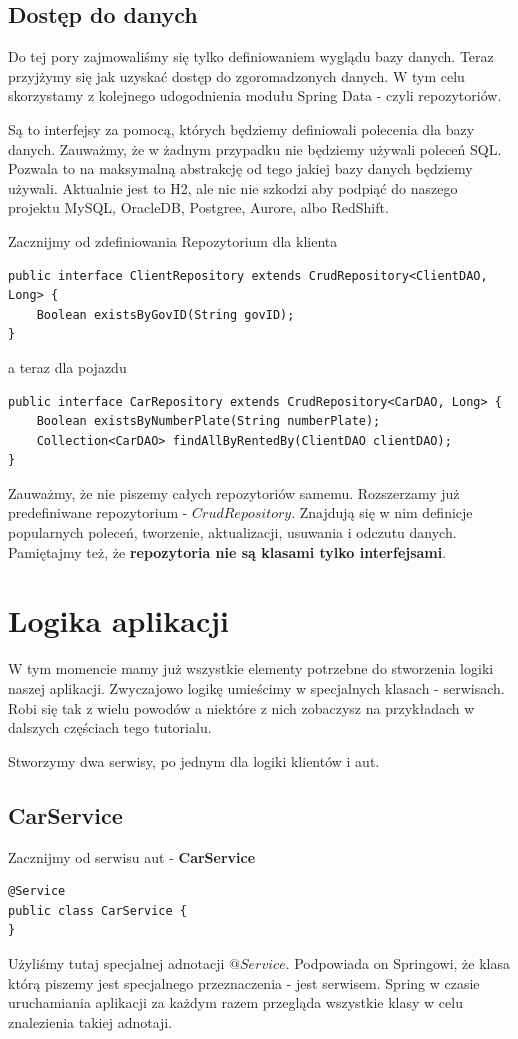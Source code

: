 \documentclass{article}
\begin{document}
        \subsection{Dostęp do danych}
            Do tej pory zajmowaliśmy się tylko definiowaniem wyglądu bazy danych. Teraz przyjżymy się jak uzyskać dostęp do zgoromadzonych danych. W tym celu skorzystamy z kolejnego udogodnienia modułu Spring Data - czyli repozytoriów. 
            
            Są to interfejsy za pomocą, których będziemy definiowali polecenia dla bazy danych. Zauważmy, że w żadnym przypadku nie będziemy używali poleceń SQL. Pozwala to na maksymalną abstrakcję od tego jakiej bazy danych będziemy używali. Aktualnie jest to H2, ale nic nie szkodzi aby podpiąć do naszego projektu MySQL, OracleDB, Postgree, Aurore, albo RedShift.
            
            Zacznijmy od zdefiniowania Repozytorium dla klienta
            \begin{verbatim}
public interface ClientRepository extends CrudRepository<ClientDAO, Long> {
    Boolean existsByGovID(String govID);
}
            \end{verbatim}
            a teraz dla pojazdu
            \begin{verbatim}
public interface CarRepository extends CrudRepository<CarDAO, Long> {
    Boolean existsByNumberPlate(String numberPlate);
    Collection<CarDAO> findAllByRentedBy(ClientDAO clientDAO);
}
            \end{verbatim}
            Zauważmy, że nie piszemy całych repozytoriów samemu. Rozszerzamy już predefiniwane repozytorium - $CrudRepository$. Znajdują się w nim definicje popularnych poleceń, tworzenie, aktualizacji, usuwania i odczutu danych. Pamiętajmy też, że \textbf{repozytoria nie są klasami tylko interfejsami}. 
    \section{Logika aplikacji}
        W tym momencie mamy już wszystkie elementy potrzebne do stworzenia logiki naszej aplikacji. Zwyczajowo logikę umieścimy w specjalnych klasach - serwisach. Robi się tak z wielu powodów a niektóre z nich zobaczysz na przykładach w dalszych częściach tego tutorialu. 
        
        Stworzymy dwa serwisy, po jednym dla logiki klientów i aut. 
        \subsection{CarService}
        Zacznijmy od serwisu aut - \textbf{CarService}
        \begin{verbatim}
@Service
public class CarService {
}
        \end{verbatim}
        Użyliśmy tutaj specjalnej adnotacji $@Service$. Podpowiada on Springowi, że klasa którą piszemy jest specjalnego przeznaczenia - jest serwisem. Spring w czasie uruchamiania aplikacji za każdym razem przegląda wszystkie klasy w celu znalezienia takiej adnotaji. 
        
\end{document}

